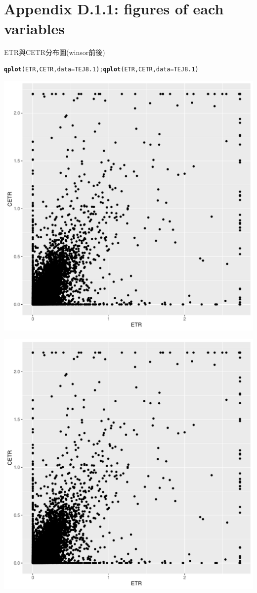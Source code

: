 \documentclass[a4paper,14pt]{article}\usepackage[]{graphicx}\usepackage[]{color}
\makeatletter
\def\maxwidth{ %
  \ifdim\Gin@nat@width>\linewidth
    \linewidth
  \else
    \Gin@nat@width
  \fi
}
\newcommand{\hlstd}[1]{\textcolor[rgb]{0.345,0.345,0.345}{#1}}%
\newcommand{\hlkwc}[1]{\textcolor[rgb]{0.333,0.667,0.333}{#1}}%
\newcommand{\hlkwd}[1]{\textcolor[rgb]{0.737,0.353,0.396}{\textbf{#1}}}%
\newenvironment{kframe}{%
 \def\at@end@of@kframe{}%
 \ifinner\ifhmode%
  \def\at@end@of@kframe{\end{minipage}}%
  \begin{minipage}{\columnwidth}%
 \fi\fi%
 \def\FrameCommand##1{\hskip\@totalleftmargin \hskip-\fboxsep
 \colorbox{shadecolor}{##1}\hskip-\fboxsep
     \hskip-\linewidth \hskip-\@totalleftmargin \hskip\columnwidth}%
 \MakeFramed {\advance\hsize-\width
   \@totalleftmargin\z@ \linewidth\hsize
   \@setminipage}}%
 {\par\unskip\endMakeFramed%
 \at@end@of@kframe}
\makeatother
\begin{document}
\newpage

\section{\\Appendix D.1.1: figures of each variables} \label{App:Appendix D.1.1}
ETR與CETR分布圖(winsor前後)\\
\begin{kframe}
\begin{alltt}
\hlkwd{qplot}\hlstd{(ETR,CETR,}\hlkwc{data}\hlstd{=TEJ8.1);}\hlkwd{qplot}\hlstd{(ETR,CETR,}\hlkwc{data}\hlstd{=TEJ8.1)}
\end{alltt}
\end{kframe}
\includegraphics[width=\maxwidth]{figure/unnamed-chunk-1-1} 

\includegraphics[width=\maxwidth]{figure/unnamed-chunk-1-2} 
\end{document}
